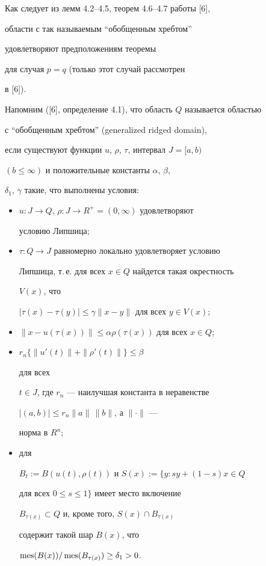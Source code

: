 \begin{notenonum}


Как следует из лемм 4.2--4.5, теорем 4.6--4.7 работы [6],


области с так называемым ``обобщенным хребтом''


удовлетворяют предположениям теоремы


для случая $p=q$ (только этот случай рассмотрен


в [6]).


\end{notenonum}





Напомним ([6], определение 4.1), что область $Q$ называется областью


с ``обобщенным хребтом'' (generalized ridged domain),


если существуют функции $u$, $\rho$, $\tau$, интервал $J=[a,b)$


$(b\le\infty)$ и положительные константы $\alpha$, $\beta$,


$\delta_1$, $\gamma$ такие, что выполнены условия:


\begin{itemize}


\item[1)] $u:J\to Q$, $\rho:J\to R^+=(0,\infty)$ удовлетворяют


условию Липшица;


\item[2)] $\tau:Q\to J$ равномерно локально удовлетворяет условию


Липшица, т.\,е. для всех $x\in Q$ найдется такая окрестность


$V(x)$, что


$|\tau(x)-\tau(y)| \le\gamma \| x- y\|$ для всех $y\in V(x)$;


\item[3)] $\|x-u(\tau(x))\|\le \alpha\rho(\tau(x))$ для всех $x\in Q$;


\item[4)] $r_n\{\|u'(t)\|+\|\rho'(t)\|\}\le\beta$


для всех


$t\in J$, где $r_n$ --- наилучшая константа в неравенстве


$|(a,b)|\le r_n \|a\|\,\|b\|$, а $\|\cdot\|$ ---


норма в $R^n$;


\item[5)] для


$B_t:=B(u(t),\rho(t))$ и $S(x):=\{y:sy+(1-s)x\in Q$


для всех $0\le s\le 1\}$ имеет место включение


$B_{\tau(x)}\subset Q$ и, кроме того, $S(x)\cap B_{\tau(x)}$


содержит такой шар $B(x)$, что


$\operatorname{mes}(B(x))/\operatorname{mes}(B_{\tau(x)})\ge\delta_1>0$.


\end{itemize}





